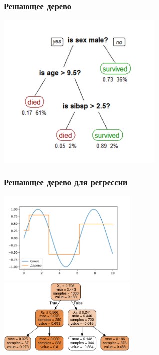 \documentclass[14pt]{beamer}
\begin{document}
\begin{frame}
\frametitle{Решающее дерево}
    \begin{center}
        \includegraphics[width=0.6\textwidth]{tree_titanic.jpg} 
    \end{center}

\end{frame}

\begin{frame}
\frametitle{Решающее дерево для регрессии}
    \begin{center}
        \includegraphics[width=0.5\textwidth]{tree_sinus.png}
        \includegraphics[width=0.5\textwidth]{tree_sinus_tree.png}
    \end{center}
    
\end{frame}
\end{document}
